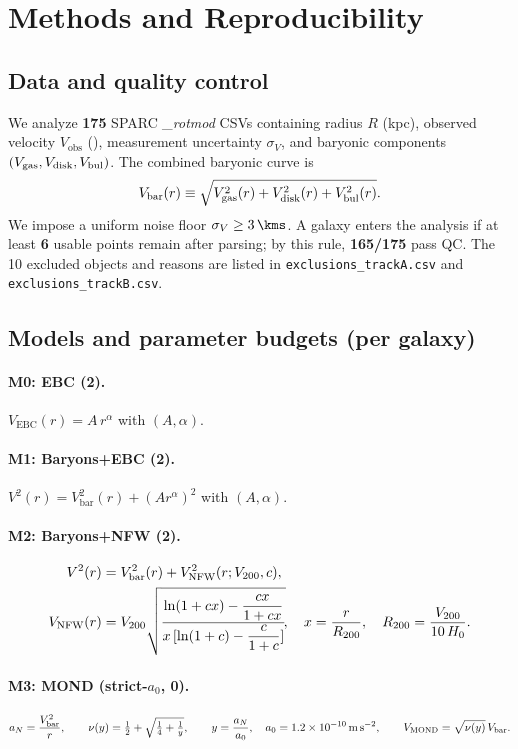 \documentclass[12pt]{article}
\newcommand{\EBC}{\mathrm{EBC}}
\newcommand{\Vbar}{V_{\mathrm{bar}}}
\newcommand{\Vobs}{V_{\mathrm{obs}}}
\begin{document}
\section{Methods and Reproducibility}

\subsection*{Data and quality control}
We analyze \textbf{175} SPARC \emph{\_rotmod} CSVs containing radius $R$ (kpc), observed velocity $\Vobs$ (\si{\kms}), measurement uncertainty $\sigma_V$, and baryonic components $(V_{\rm gas},V_{\rm disk},V_{\rm bul})$. The combined baryonic curve is
\begin{equation}
  \Vbar(r) \equiv \sqrt{V_{\rm gas}^2(r)+V_{\rm disk}^2(r)+V_{\rm bul}^2(r)}.
\end{equation}
We impose a uniform noise floor $\sigma_V\ge\SI{3}{\kms}$. A galaxy enters the analysis if at least \textbf{6} usable points remain after parsing; by this rule, \textbf{165/175} pass QC. The 10 excluded objects and reasons are listed in \texttt{exclusions\_trackA.csv} and \texttt{exclusions\_trackB.csv}.

\subsection*{Models and parameter budgets (per galaxy)}
\paragraph{M0: EBC (2).} $V_{\EBC}(r)=A\,r^\alpha$ with $(A,\alpha)$.
\paragraph{M1: Baryons+EBC (2).} $V^2(r)=\Vbar^2(r)+(A r^\alpha)^2$ with $(A,\alpha)$.
\paragraph{M2: Baryons+NFW (2).}
\begin{align}
  V^2(r) &= \Vbar^2(r)+V_{\rm NFW}^2(r;V_{200},c),\\
  V_{\rm NFW}(r) &=
  V_{200}\sqrt{\frac{\ln(1+c x)-\dfrac{c x}{1+c x}}{x\,[\ln(1+c)-\dfrac{c}{1+c}]}}\!,
  \quad x=\frac{r}{R_{200}},\quad R_{200}=\frac{V_{200}}{10\,H_0}.
\end{align}
\paragraph{M3: MOND (strict-$a_0$, 0).}
\begin{align}
  a_N=\frac{\Vbar^2}{r},\qquad
  \nu(y)=\tfrac{1}{2}+\sqrt{\tfrac{1}{4}+\tfrac{1}{y}},\qquad
  y=\frac{a_N}{a_0},\quad a_0=1.2\times10^{-10}\,\mathrm{m\,s^{-2}},\qquad
  V_{\rm MOND}=\sqrt{\nu(y)}\,\Vbar.
\end{align}
\end{document}
